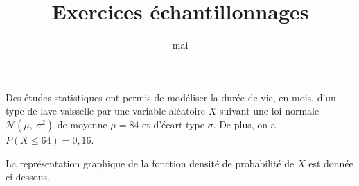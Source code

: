 \documentclass[12pt,frenchb]{article}
\title{Exercices échantillonnages}
\date{mai \the\year}
\author{}
\begin{document}
\begin{question}[subtitle={Pondichery 2015}]
Des études statistiques ont permis de modéliser la durée de vie, en mois, d'un type de lave-vaisselle par une variable aléatoire $X$ suivant une loi normale $\mathcal{N}\left(\mu,~ \sigma^2\right)$ de moyenne $\mu = 84$ et d'écart-type $\sigma$. De plus, on a $P(X \leqslant 64) = 0,16$. 

La représentation graphique de la fonction densité de probabilité de $X$ est donnée ci-dessous.



\end{question}
\end{document}
